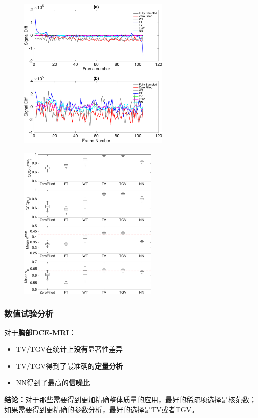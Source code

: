 \documentclass{beamer}
\begin{document}
\begin{frame}
	\begin{figure}[htbp]
\centerline{\includegraphics[width=0.65\textwidth]{../img/qetsr/figure6}}
\end{figure}
\end{frame}

\begin{frame}
\begin{figure}[htbp]
\centerline{
    \includegraphics[width=0.6\textwidth]{../img/qetsr/figure7.eps}
}
\end{figure}
\end{frame}

\begin{frame}
	\frametitle{数值试验分析}
	对于\textbf{胸部DCE-MRI}：
	\begin{itemize}
		\item TV/TGV在统计上\textbf{没有}显著性差异
		\item TV/TGV得到了最准确的\textbf{定量分析}
		\item NN得到了最高的\textbf{信噪比}
	\end{itemize}
	\vspace{1cm}
	\textbf{结论：}对于那些需要得到更加精确整体质量的应用，最好的稀疏项选择是核范数；如果需要得到更精确的参数分析，最好的选择是TV或者TGV。
\end{frame}
\end{document}
